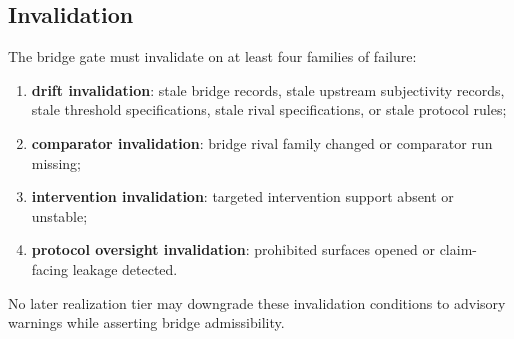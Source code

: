 \documentclass[11pt,a4paper]{article}
\theoremstyle{definition}
\begin{document}
\subsection{Invalidation}
The bridge gate must invalidate on at least four families of failure:
\begin{enumerate}[leftmargin=1.5em]
\item \textbf{drift invalidation}: stale bridge records, stale upstream subjectivity records, stale threshold specifications, stale rival specifications, or stale protocol rules;
\item \textbf{comparator invalidation}: bridge rival family changed or comparator run missing;
\item \textbf{intervention invalidation}: targeted intervention support absent or unstable;
\item \textbf{protocol oversight invalidation}: prohibited surfaces opened or claim-facing leakage detected.
\end{enumerate}
No later realization tier may downgrade these invalidation conditions to advisory warnings while asserting bridge admissibility.
\end{document}
